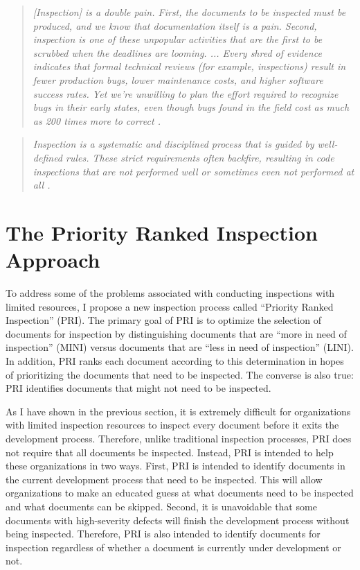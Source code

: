 \begin{quotation}
  \textit{[Inspection] is a double pain. First, the documents to be
    inspected must be produced, and we know that documentation itself is a
    pain.  Second, inspection is one of these unpopular activities that are
    the first to be scrubbed when the deadlines are looming. ... Every
    shred of evidence indicates that formal technical reviews (for example,
    inspections) result in fewer production bugs, lower maintenance costs,
    and higher software success rates. Yet we're unwilling to plan the
    effort required to recognize bugs in their early states, even though
    bugs found in the field cost as much as 200 times more to correct
    \cite{Berry02}. }
\end{quotation}

\begin{quotation}
  \textit{Inspection is a systematic and disciplined process that is guided 
    by well-defined rules. These strict requirements often backfire,
    resulting in code inspections that are not performed well or sometimes
    even not performed at all \cite{vanEmden02}.}
\end{quotation}






\section{The Priority Ranked Inspection Approach}
\label{section:PRI-approach}
To address some of the problems associated with conducting inspections with
limited resources, I propose a new inspection process called ``Priority
Ranked Inspection'' (PRI). The primary goal of PRI is to optimize the
selection of documents for inspection by distinguishing documents that are
``more in need of inspection'' (MINI) versus documents that are ``less in
need of inspection'' (LINI). In addition, PRI ranks each document according
to this determination in hopes of prioritizing the documents that need to
be inspected. The converse is also true: PRI identifies documents that
might not need to be inspected.

As I have shown in the previous section, it is extremely difficult for
organizations with limited inspection resources to inspect every document
before it exits the development process. Therefore, unlike traditional
inspection processes, PRI does not require that all documents be inspected.
Instead, PRI is intended to help these organizations in two ways. First,
PRI is intended to identify documents in the current development process
that need to be inspected. This will allow organizations to make an
educated guess at what documents need to be inspected and what documents
can be skipped. Second, it is unavoidable that some documents with
high-severity defects will finish the development process without being
inspected. Therefore, PRI is also intended to identify documents for
inspection regardless of whether a document is currently under development 
or not.

